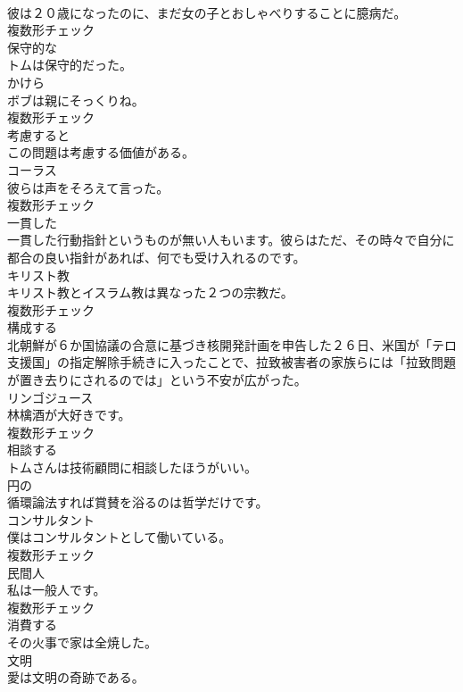 \documentclass[8pt]{extreport}
\begin{document}
\begin{CJK}{UTF8}{min}
\\	彼は２０歳になったのに、まだ女の子とおしゃべりすることに臆病だ。	
\\	複数形チェック
\\	[形容詞]	保守的な	
\\	トムは保守的だった。	
\\	[名詞]	かけら	
\\	ボブは親にそっくりね。	
\\	複数形チェック
\\	[前置詞]	考慮すると	
\\	この問題は考慮する価値がある。	
\\	[名詞]	コーラス	
\\	彼らは声をそろえて言った。	
\\	複数形チェック
\\	[形容詞]	一貫した	
\\	一貫した行動指針というものが無い人もいます。彼らはただ、その時々で自分に都合の良い指針があれば、何でも受け入れるのです。	
\\	[名詞]	キリスト教	
\\	キリスト教とイスラム教は異なった２つの宗教だ。	
\\	複数形チェック
\\	[動詞]	構成する	
\\	北朝鮮が６か国協議の合意に基づき核開発計画を申告した２６日、米国が「テロ支援国」の指定解除手続きに入ったことで、拉致被害者の家族らには「拉致問題が置き去りにされるのでは」という不安が広がった。	
\\	[名詞]	リンゴジュース	
\\	林檎酒が大好きです。	
\\	複数形チェック
\\	[動詞]	相談する	
\\	トムさんは技術顧問に相談したほうがいい。	
\\	[形容詞]	円の	
\\	循環論法すれば賞賛を浴るのは哲学だけです。	
\\	[名詞]	コンサルタント	
\\	僕はコンサルタントとして働いている。	
\\	複数形チェック
\\	[名詞]	⺠間人	
\\	私は一般人です。	
\\	複数形チェック
\\	[動詞]	消費する	
\\	その火事で家は全焼した。	
\\	[名詞]	文明	
\\	愛は文明の奇跡である。	

\end{CJK}
\end{document}
